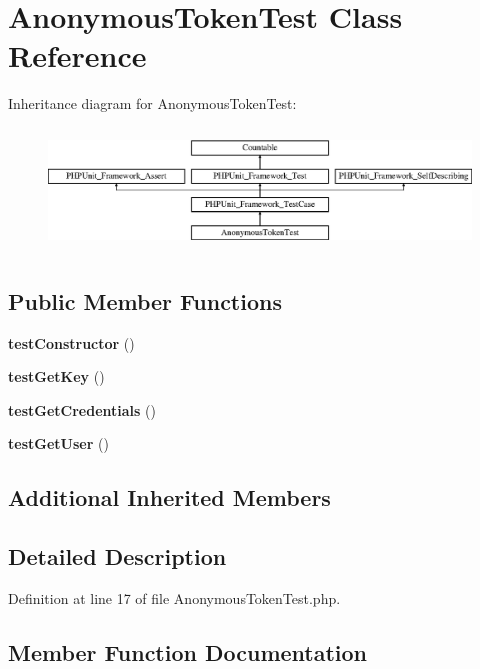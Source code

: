 \section{Anonymous\+Token\+Test Class Reference}
\label{class_symfony_1_1_component_1_1_security_1_1_core_1_1_tests_1_1_authentication_1_1_token_1_1_anonymous_token_test}
Inheritance diagram for Anonymous\+Token\+Test\+:\begin{figure}[H]
\begin{center}
\leavevmode
\includegraphics[height=3.303835cm]{class_symfony_1_1_component_1_1_security_1_1_core_1_1_tests_1_1_authentication_1_1_token_1_1_anonymous_token_test}
\end{center}
\end{figure}
\subsection*{Public Member Functions}
\begin{DoxyCompactItemize}
\item 
{\bf test\+Constructor} ()
\item 
{\bf test\+Get\+Key} ()
\item 
{\bf test\+Get\+Credentials} ()
\item 
{\bf test\+Get\+User} ()
\end{DoxyCompactItemize}
\subsection*{Additional Inherited Members}


\subsection{Detailed Description}


Definition at line 17 of file Anonymous\+Token\+Test.\+php.



\subsection{Member Function Documentation}
